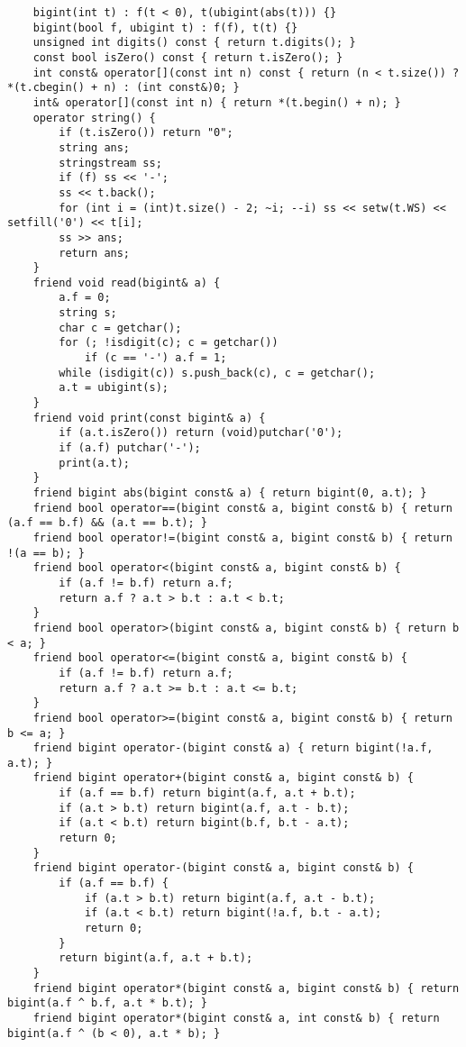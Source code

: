 \begin{verbatim}
    bigint(int t) : f(t < 0), t(ubigint(abs(t))) {}
    bigint(bool f, ubigint t) : f(f), t(t) {}
    unsigned int digits() const { return t.digits(); }
    const bool isZero() const { return t.isZero(); }
    int const& operator[](const int n) const { return (n < t.size()) ? *(t.cbegin() + n) : (int const&)0; }
    int& operator[](const int n) { return *(t.begin() + n); }
    operator string() {
        if (t.isZero()) return "0";
        string ans;
        stringstream ss;
        if (f) ss << '-';
        ss << t.back();
        for (int i = (int)t.size() - 2; ~i; --i) ss << setw(t.WS) << setfill('0') << t[i];
        ss >> ans;
        return ans;
    }
    friend void read(bigint& a) {
        a.f = 0;
        string s;
        char c = getchar();
        for (; !isdigit(c); c = getchar())
            if (c == '-') a.f = 1;
        while (isdigit(c)) s.push_back(c), c = getchar();
        a.t = ubigint(s);
    }
    friend void print(const bigint& a) {
        if (a.t.isZero()) return (void)putchar('0');
        if (a.f) putchar('-');
        print(a.t);
    }
    friend bigint abs(bigint const& a) { return bigint(0, a.t); }
    friend bool operator==(bigint const& a, bigint const& b) { return (a.f == b.f) && (a.t == b.t); }
    friend bool operator!=(bigint const& a, bigint const& b) { return !(a == b); }
    friend bool operator<(bigint const& a, bigint const& b) {
        if (a.f != b.f) return a.f;
        return a.f ? a.t > b.t : a.t < b.t;
    }
    friend bool operator>(bigint const& a, bigint const& b) { return b < a; }
    friend bool operator<=(bigint const& a, bigint const& b) {
        if (a.f != b.f) return a.f;
        return a.f ? a.t >= b.t : a.t <= b.t;
    }
    friend bool operator>=(bigint const& a, bigint const& b) { return b <= a; }
    friend bigint operator-(bigint const& a) { return bigint(!a.f, a.t); }
    friend bigint operator+(bigint const& a, bigint const& b) {
        if (a.f == b.f) return bigint(a.f, a.t + b.t);
        if (a.t > b.t) return bigint(a.f, a.t - b.t);
        if (a.t < b.t) return bigint(b.f, b.t - a.t);
        return 0;
    }
    friend bigint operator-(bigint const& a, bigint const& b) {
        if (a.f == b.f) {
            if (a.t > b.t) return bigint(a.f, a.t - b.t);
            if (a.t < b.t) return bigint(!a.f, b.t - a.t);
            return 0;
        }
        return bigint(a.f, a.t + b.t);
    }
    friend bigint operator*(bigint const& a, bigint const& b) { return bigint(a.f ^ b.f, a.t * b.t); }
    friend bigint operator*(bigint const& a, int const& b) { return bigint(a.f ^ (b < 0), a.t * b); }

\end{verbatim}

